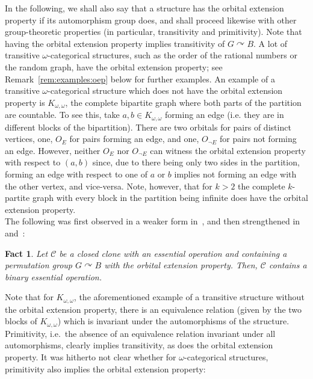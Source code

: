 \documentclass{article}
\newtheorem{fact}[theorem]{Fact}
\theoremstyle{remark}
\theoremstyle{definition}
\def\acts{\curvearrowright}
\begin{document}
In the following, we shall also say that a structure has the orbital extension property if its automorphism group does, and shall proceed likewise with other group-theoretic properties (in particular, transitivity and primitivity). 
Note that having the orbital extension property implies transitivity of $G\acts B$.  A lot of transitive $\omega$-categorical structures, such as the order of the rational numbers or the random graph, have the orbital extension property; see Remark~\ref{rem:examples:oep} below for further examples. 
An example of a transitive $\omega$-categorical structure which does not have the orbital extension property is $K_{\omega, \omega}$, the complete bipartite graph where both parts of the partition are countable. To see this, take $a,b\in K_{\omega, \omega}$ forming an edge (i.e. they are in different blocks of the bipartition). There are two orbitals for pairs of distinct vertices, one, $O_E$ for pairs forming an edge, and one, $O_{\neg E}$ for pairs not forming an edge. However, neither $O_E$ nor  $O_{\neg E}$ can witness the orbital extension property with respect to $(a,b)$ since, due to there being only two sides in the partition, forming an edge with respect to one of $a$ or $b$ implies not forming an edge with the other vertex, and vice-versa. Note, however, that for $k>2$ the  complete $k$-partite graph with every block in the partition being infinite does have the orbital extension property.\\

The following was first observed in a weaker form in~\cite[Lemma 5]{BodKara}, and then strengthened in~\cite[Lemma 40]{minrandom} and~\cite[Proposition 22]{Smoothapp}:


\begin{fact}\label{fact:OEPfact} Let $\mathcal{C}$ be a closed clone with an essential operation and containing a permutation group $G\acts B$ with the orbital extension property. Then, $\mathcal{C}$ contains a binary essential operation.
\end{fact}

Note that for $K_{\omega, \omega}$, the aforementioned example of a transitive structure without the orbital extension property, there is an equivalence relation (given by the two blocks of $K_{\omega, \omega}$) which is invariant under the automorphisms of the structure. Primitivity, i.e.~the absence of an equivalence relation invariant under all automorphisms, clearly implies transitivity, as does the orbital extension property.  It was hitherto not clear whether for $\omega$-categorical structures, primitivity also   implies the orbital extension property:
\end{document}

